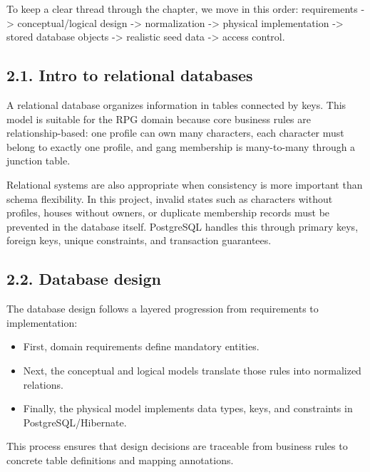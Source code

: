 To keep a clear thread through the chapter, we move in this order:
requirements -\textgreater{} conceptual/logical design -\textgreater{}
normalization -\textgreater{} physical implementation -\textgreater{}
stored database objects -\textgreater{} realistic seed data
-\textgreater{} access control.

\hypertarget{intro-to-relational-databases}{%
\subsection{2.1. Intro to relational
databases}\label{intro-to-relational-databases}}

A relational database organizes information in tables connected by keys.
This model is suitable for the RPG domain because core business rules
are relationship-based: one profile can own many characters, each
character must belong to exactly one profile, and gang membership is
many-to-many through a junction table.

Relational systems are also appropriate when consistency is more
important than schema flexibility. In this project, invalid states such
as characters without profiles, houses without owners, or duplicate
membership records must be prevented in the database itself. PostgreSQL
handles this through primary keys, foreign keys, unique constraints, and
transaction guarantees.

\hypertarget{database-design}{%
\subsection{2.2. Database design}\label{database-design}}

The database design follows a layered progression from requirements to
implementation:

\begin{itemize}
\tightlist
\item
  First, domain requirements define mandatory entities.
\item
  Next, the conceptual and logical models translate those rules into
  normalized relations.
\item
  Finally, the physical model implements data types, keys, and
  constraints in PostgreSQL/Hibernate.
\end{itemize}

This process ensures that design decisions are traceable from business
rules to concrete table definitions and mapping annotations.

\newpage

